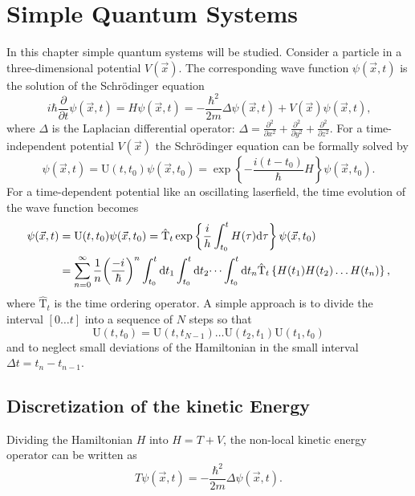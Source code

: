 \documentclass[twoside,        %
			   12pt,			%
               BCOR10mm,       %
               ngerman,english  %
               ]{scrartcl}
\begin{document}


\section{Simple Quantum Systems}\label{1}
In this chapter simple quantum systems will be studied. Consider a particle in a three-dimensional potential $V(\vec{x})$. The corresponding wave function $\psi(\vec{x}, t)$ is the solution of the Schrödinger equation
\begin{equation}
  i\hbar \frac{\partial}{\partial t} \psi(\vec{x}, t) = H \psi(\vec{x}, t) = - \frac{\hbar^2}{2m}	\Delta \psi(\vec{x}, t)+  V(\vec{x}) \psi(\vec{x}, t) \text{,}
\end{equation}
where $\Delta$ is the Laplacian differential operator: $\Delta = \frac{\partial^2}{\partial x^2} +\frac{\partial^2}{\partial y^2} + \frac{\partial^2}{\partial z^2} $. For a time-independent potential $V(\vec{x})$ the Schrödinger equation can be formally solved by 
\begin{equation}
     \psi(\vec{x}, t) = \text{U}(t, t_0) \psi(\vec{x}, t_0)   = \exp \left\{ - \frac{i(t-t_0) }{\hbar} H \right\}  \psi(\vec{x}, t_0) \text{.}
\end{equation} 
For a time-dependent potential like an oscillating laserfield, the time evolution of the wave function becomes
\begin{align}
   \psi(\vec{x}, t) &= \text{U}(t, t_0) \psi(\vec{x}, t_0)  = \hat{\text{T}}_t  \exp \left\{ \frac{i}{h} \int_{t_0}^t H(\tau) \mathrm{d} \tau \right \}  \psi(\vec{x}, t_0)  \\
   &=  \sum_{n = 0}^\infty \frac{1}{n} {\left( \frac{- i}{\hbar} \right) }^n \int_{t_0}^t \mathrm{d} t_1\int_{t_0}^t \mathrm{d} t_2 \dots \int_{t_0}^t \mathrm{d} t_n \hat{\text{T}}_t \left\{ H(t_1)H(t_2) \dots H(t_n) \right\} \text{,} \nonumber
\end{align} 
where $\hat{\text{T}}_t$ is the time ordering operator. A simple approach is to divide the interval $[0 \dots t]$ into a sequence of $N$ steps so that
\begin{equation}
   \text{U}(t, t_0) = \text{U}(t, t_{N-1}) \dots \text{U}(t_2, t_1)\text{U}(t_1, t_0)
\end{equation}   and to neglect small deviations of the Hamiltonian in the small interval $\Delta t = t_n - t_{n-1}$.
   
\subsection{Discretization of the kinetic Energy}
Dividing the Hamiltonian $H$ into $H = T + V$, the non-local kinetic energy operator can be written as
\begin{equation}
    T \psi(\vec{x}, t) = - \frac{\hbar^2}{2m} \Delta \psi(\vec{x}, t) \text{.}
\end{equation}
    
\end{document}
